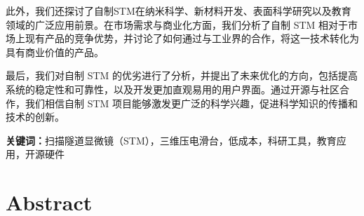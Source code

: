 \documentclass{article}
\begin{document}
此外，我们还探讨了自制STM在纳米科学、新材料开发、表面科学研究以及教育领域的广泛应用前景。在市场需求与商业化方面，我们分析了自制 STM 相对于市场上现有产品的竞争优势，并讨论了如何通过与工业界的合作，将这一技术转化为具有商业价值的产品。

最后，我们对自制 STM 的优劣进行了分析，并提出了未来优化的方向，包括提高系统的稳定性和可靠性，以及开发更加直观易用的用户界面。通过开源与社区合作，我们相信自制 STM 项目能够激发更广泛的科学兴趣，促进科学知识的传播和技术的创新。

\textbf{关键词：}扫描隧道显微镜（STM），三维压电滑台，低成本，科研工具，教育应用，开源硬件

\newpage
\section*{\textbf{Abstract}} %
\end{document}
